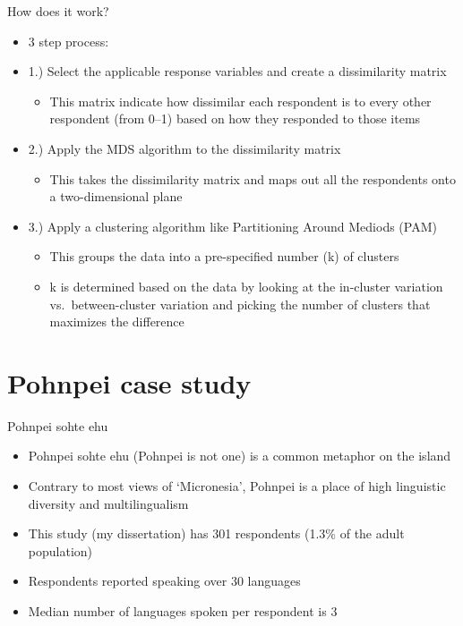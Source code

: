 \documentclass[10pt]{beamer}
\begin{document}
\begin{frame}{How does it work?}
\begin{itemize}
\item 3 step process:
\item 1.) Select the applicable response variables and create a dissimilarity matrix
\begin{itemize}
\item This matrix indicate how dissimilar each respondent  is to every other respondent (from 0--1) based on how they responded to those items
\end{itemize}
\item 2.) Apply the MDS algorithm to the dissimilarity matrix
\begin{itemize}
\item This takes the dissimilarity matrix and maps out all the respondents onto a two-dimensional plane
\end{itemize}
\item 3.) Apply a clustering algorithm like Partitioning Around Mediods (PAM)
\begin{itemize}
\item This groups the data into a pre-specified number (k) of clusters
\item k is determined based on the data by looking at the in-cluster variation vs.~between-cluster variation and picking the number of clusters that maximizes the difference \citep{Rousseeuw:1987}
\end{itemize}
\end{itemize}
\end{frame}

\section{Pohnpei case study}

\begin{frame}{Pohnpei sohte ehu}
\begin{itemize}
\item Pohnpei sohte ehu (Pohnpei is not one) is a common metaphor on the island
\item Contrary to most views of `Micronesia', Pohnpei is a place of high linguistic diversity and multilingualism
\item This study (my dissertation) has 301 respondents (1.3\% of the adult population)
\item Respondents reported speaking over 30 languages 
\item Median number of languages spoken per respondent is 3
\end{itemize}
\end{frame}
\end{document}
